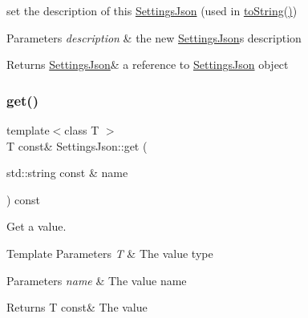 set the description of this \hyperlink{class_settings_json}{Settings\+Json} (used in \hyperlink{class_settings_json_adf9b6991ed9896cc90455a016b5a9f29}{to\+String()}) 


\begin{DoxyParams}{Parameters}
{\em description} & the new \hyperlink{class_settings_json}{Settings\+Json}\textquotesingle{}s description \\
\hline
\end{DoxyParams}
\begin{DoxyReturn}{Returns}
\hyperlink{class_settings_json}{Settings\+Json}\& a reference to \hyperlink{class_settings_json}{Settings\+Json} object 
\end{DoxyReturn}
\mbox{\label{class_settings_json_a6c600f3c639d8e67cdf3060e16904dcc}} 
\subsubsection{\texorpdfstring{get()}{get()}\hspace{0.1cm}{\footnotesize\ttfamily [1/2]}}
{\footnotesize\ttfamily template$<$class T $>$ \\
T const\& Settings\+Json\+::get (\begin{DoxyParamCaption}\item[{std\+::string const \&}]{name }\end{DoxyParamCaption}) const\hspace{0.3cm}{\ttfamily [inline]}}



Get a value. 


\begin{DoxyTemplParams}{Template Parameters}
{\em T} & The value type \\
\hline
\end{DoxyTemplParams}

\begin{DoxyParams}{Parameters}
{\em name} & The value name \\
\hline
\end{DoxyParams}
\begin{DoxyReturn}{Returns}
T const\& The value 
\end{DoxyReturn}
\mbox{\label{class_settings_json_a55879571926455d789d0523627408f0c}} 
